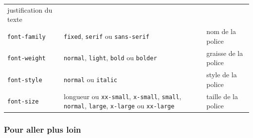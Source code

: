 \documentclass[a4paper,17pt]{extarticle}
\begin{document}
\begin{exemple}
\begin{longtable}[]{@{}lll@{}}
\begin{minipage}[t]{0.37\columnwidth}
justification du texte\strut
\end{minipage}\tabularnewline
\begin{minipage}[t]{0.31\columnwidth}\raggedright
\texttt{font-family}\strut
\end{minipage} & \begin{minipage}[t]{0.23\columnwidth}\raggedright
\texttt{fixed}, \texttt{serif} ou \texttt{sans-serif}\strut
\end{minipage} & \begin{minipage}[t]{0.37\columnwidth}\raggedright
nom de la police\strut
\end{minipage}\tabularnewline
\begin{minipage}[t]{0.31\columnwidth}\raggedright
\texttt{font-weight}\strut
\end{minipage} & \begin{minipage}[t]{0.23\columnwidth}\raggedright
\texttt{normal}, \texttt{light}, \texttt{bold} ou \texttt{bolder}\strut
\end{minipage} & \begin{minipage}[t]{0.37\columnwidth}\raggedright
graisse de la police\strut
\end{minipage}\tabularnewline
\begin{minipage}[t]{0.31\columnwidth}\raggedright
\texttt{font-style}\strut
\end{minipage} & \begin{minipage}[t]{0.23\columnwidth}\raggedright
\texttt{normal} ou \texttt{italic}\strut
\end{minipage} & \begin{minipage}[t]{0.37\columnwidth}\raggedright
style de la police\strut
\end{minipage}\tabularnewline
\begin{minipage}[t]{0.31\columnwidth}\raggedright
\texttt{font-size}\strut
\end{minipage} & \begin{minipage}[t]{0.23\columnwidth}\raggedright
longueur ou \texttt{xx-small}, \texttt{x-small}, \texttt{small},
\texttt{normal}, \texttt{large}, \texttt{x-large} ou
\texttt{xx-large}\strut
\end{minipage} & \begin{minipage}[t]{0.37\columnwidth}\raggedright
taille de la police\strut
\end{minipage}\tabularnewline
\bottomrule
\end{longtable}

            \end{exemple}
    \hypertarget{pour-aller-plus-loin}{%
\subsubsection{Pour aller plus loin}\label{pour-aller-plus-loin}}
\end{document}
